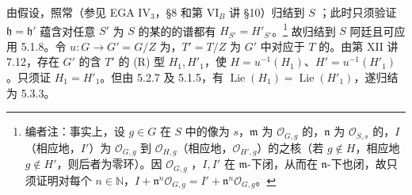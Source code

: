 由假设，照常（参见 EGA IV$_3$，§8 和第 VI$_B$ 讲 §10）归结到 $S$ ；此时只须验证 $\mathfrak h=\mathfrak h'$ 蕴含对任意 $S'$ 为 $S$ 的某的的谱都有 $H_{S'}=H'_{S'}$。\footnote{编者注：事实上，设 $g\in G$ 在 $S$ 中的像为 $s$，$\mathfrak m$ 为 $\mathcal O_{G,g}$ 的，$\mathfrak n$ 为 $\mathcal O_{S,s}$ 的，$I$（相应地，$I'$）为 $\mathcal O_{G,g}$ 到 $\mathcal O_{H,g}$（相应地，$\mathcal O_{H',g}$）的之核（若 $g\notin H$，相应地 $g\notin H'$，则后者为零环）。因 $\mathcal O_{G,g}$ ，$I,I'$ 在 $\mathfrak m$-下闭，从而在 $\mathfrak n$-下也闭，故只须证明对每个 $n\in\mathbb N$，$I+\mathfrak n^n\mathcal O_{G,g}=I'+\mathfrak n^n\mathcal O_{G,g}$。} 故归结到 $S$ 阿廷且可应用 5.1.8。令 $u:G\to G'=G/Z$ 为，$T'=T/Z$ 为 $G'$ 中对应于 $T$ 的。由第 XII 讲 7.12，存在 $G'$ 的含 $T'$ 的 (R) 型 $H_1,H'_1$，使 $H=u^{-1}(H_1)$、$H'=u^{-1}(H'_1)$。只须证 $H_1=H'_1$。但由 5.2.7 及 5.1.5，有 $\operatorname{Lie}(H_1)=\operatorname{Lie}(H'_1)$，遂归结为 5.3.3。

